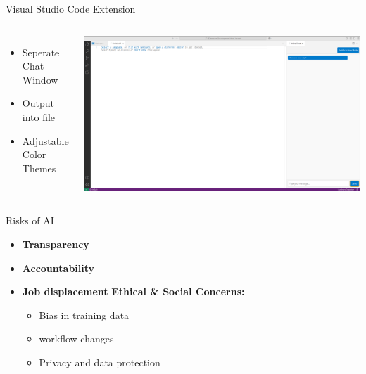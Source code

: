 \documentclass{beamer}
\begin{document}
\begin{frame}{Visual Studio Code Extension}
  \begin{columns}
      \begin{itemize}
        \item Seperate Chat-Window
        \item Output into file
        \item Adjustable Color Themes
      \end{itemize}
      \centering
      \includegraphics[width=\textwidth]{VSCodeExtension.png}
  \end{columns}
\end{frame}

\begin{frame}{Risks of AI}

  \begin{itemize}
    \item \textbf{Transparency}
    \item \textbf{Accountability}
    \item \textbf{Job displacement}
    \textbf{Ethical \& Social Concerns:}
    \begin{itemize}
      \item Bias in training data
      \item workflow changes
      \item Privacy and data protection
    \end{itemize}
  \end{itemize}


\end{frame}
\end{document}
